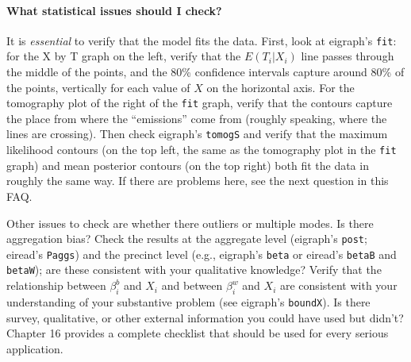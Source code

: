\documentclass[11pt,titlepage]{article}
\begin{document}
\paragraph{What statistical issues should I check?}
It is \emph{essential} to verify that the model fits the data.  First,
look at eigraph's \texttt{fit}: for the X by T graph on the left,
verify that the $E(T_i|X_i)$ line passes through the middle of the
points, and the 80\% confidence intervals capture around 80\% of the
points, vertically for each value of $X$ on the horizontal axis.  For
the tomography plot of the right of the \texttt{fit} graph, verify
that the contours capture the place from where the ``emissions'' come
from (roughly speaking, where the lines are crossing).  Then check
eigraph's \texttt{tomogS} and verify that the maximum likelihood
contours (on the top left, the same as the tomography plot in the
\texttt{fit} graph) and mean posterior contours (on the top right)
both fit the data in roughly the same way.  If there are problems
here, see the next question in this FAQ.

Other issues to check are whether there outliers or multiple modes. Is
there aggregation bias?  Check the results at the aggregate level
(eigraph's \texttt{post}; eiread's \texttt{Paggs}) and the precinct
level (e.g., eigraph's \texttt{beta} or eiread's \texttt{betaB} and
\texttt{betaW}); are these consistent with your qualitative knowledge?
Verify that the relationship between $\beta_i^b$ and $X_i$ and between
$\beta_i^w$ and $X_i$ are consistent with your understanding of your
substantive problem (see eigraph's \texttt{boundX}).  Is there survey,
qualitative, or other external information you could have used but
didn't?  Chapter 16 provides a complete checklist that should be used
for every serious application.
\end{document}

